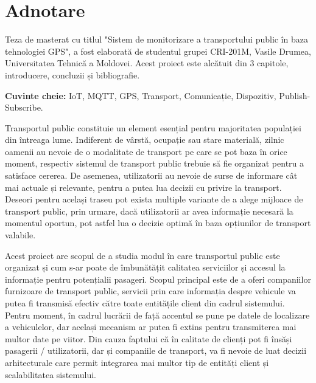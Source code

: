 \chapter*{Adnotare}
\author{Vasile Drumea}
\thispagestyle{empty}
\par Teza de masterat cu titlul "Sistem de monitorizare a transportului public în baza tehnologiei GPS", a fost elaborată de studentul grupei CRI-201M, Vasile Drumea, Universitatea Tehnică a Moldovei. Acest proiect este alcătuit din 3 capitole, introducere, concluzii și bibliografie.
\par \textbf{Cuvinte cheie:} IoT, MQTT, GPS, Transport, Comunicație, Dispozitiv, Publish-Subscribe.
\par Transportul public constituie un element esențial pentru majoritatea populației din întreaga lume. Indiferent de vârstă, ocupație sau stare materială, zilnic oamenii au nevoie de o modalitate de transport pe care se pot baza în orice moment, respectiv sistemul de transport public trebuie să fie organizat pentru a satisface cererea. De asemenea, utilizatorii au nevoie de surse de informare cât mai actuale și relevante, pentru a putea lua decizii cu privire la transport. Deseori pentru același traseu pot exista multiple variante de a alege mijloace de transport public, prin urmare, dacă utilizatorii ar avea informație necesară la momentul oportun, pot astfel lua o decizie optimă în baza opțiunilor de transport valabile.
\par Acest proiect are scopul de a studia modul în care transportul public este organizat și cum s-ar poate de îmbunătățit calitatea serviciilor și accesul la informație pentru potențialii pasageri. Scopul principal este de a oferi companiilor furnizoare de transport public, servicii prin care informația despre vehicule va putea fi transmisă efectiv către toate entitățile client din cadrul sistemului. Pentru moment, în cadrul lucrării de față accentul se pune pe datele de localizare a vehiculelor, dar același mecanism ar putea fi extins pentru transmiterea mai multor date pe viitor. Din cauza faptului că în calitate de clienți pot fi însăși pasagerii / utilizatorii, dar și companiile de transport, va fi nevoie de luat decizii arhitecturale care permit integrarea mai multor tip de entități client și scalabilitatea sistemului.
